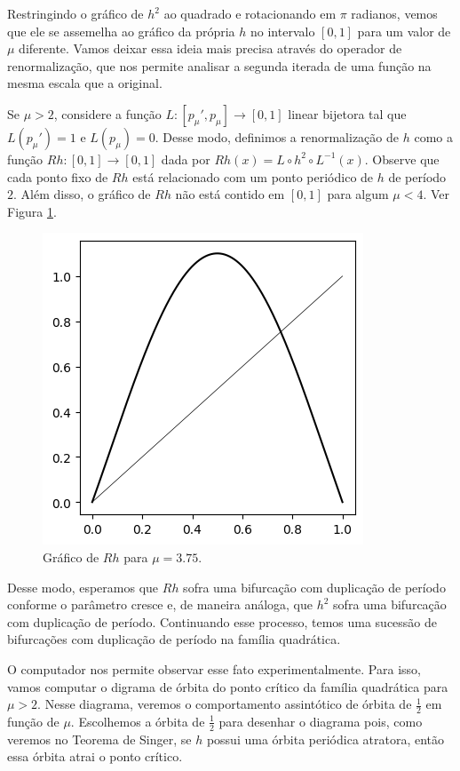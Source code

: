 Restringindo o gráfico de $h^2$ ao quadrado e rotacionando em $\pi$ radianos, vemos que ele se assemelha ao gráfico da própria $h$ no intervalo $[0, 1]$ para um valor de $\mu$ diferente. Vamos deixar essa ideia mais precisa através do operador de renormalização, que nos permite analisar a segunda iterada de uma função na mesma escala que a original.

Se $\mu > 2$, considere a função $L: [p_\mu', p_\mu] \to [0, 1]$ linear bijetora tal que $L(p_\mu') = 1$ e $L(p_\mu) = 0$.
Desse modo, definimos a renormalização de $h$ como a função $Rh: [0, 1] \to [0, 1]$ dada por $Rh(x) = L \circ h^2 \circ L^{-1}(x)$.
Observe que cada ponto fixo de $Rh$ está relacionado com um ponto periódico de $h$ de período $2$. Além disso, o gráfico de $Rh$ não está contido em $[0, 1]$ para algum $\mu < 4$. Ver Figura \ref{renormalization}.

\begin{figure}[!htb]
\centering
\includegraphics[scale=0.6]{images/renormalization.png}
\caption{Gráfico de $Rh$ para $\mu = 3.75$.}
\label{renormalization}
\end{figure}

Desse modo, esperamos que $Rh$ sofra uma bifurcação com duplicação de período conforme o parâmetro cresce e, de maneira análoga, que $h^2$ sofra uma bifurcação com duplicação de período. Continuando esse processo, temos uma sucessão de bifurcações com duplicação de período na família quadrática.

O computador nos permite observar esse fato experimentalmente.
Para isso, vamos computar o digrama de órbita do ponto crítico da família quadrática para $\mu > 2$.
Nesse diagrama, veremos o comportamento assintótico de órbita de $\frac{1}{2}$ em função de $\mu$.
Escolhemos a órbita de $\frac{1}{2}$ para desenhar o diagrama pois, como veremos no Teorema de Singer, se $h$ possui uma órbita periódica atratora, então essa órbita  atrai o ponto crítico.

